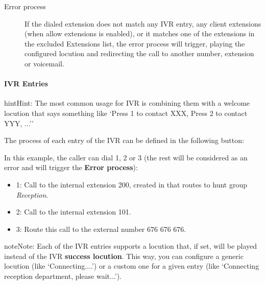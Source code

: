 \documentclass[letterpaper,10pt,english]{sphinxmanual}
\begin{document}
\begin{description}
\item[{Error process}] \leavevmode{}\label{administration_portal/client/vpbx/routing_endpoints/ivrs:term-error-process}
If the dialed extension does not match any IVR entry, any client extensions
(when allow extensions is enabled), or it matches one of the extensions in the
excluded Extensions list, the error process will trigger, playing the configured
locution and redirecting the call to another number, extension or voicemail.

\end{description}


\paragraph{IVR Entries}
\label{administration_portal/client/vpbx/routing_endpoints/ivrs:ivr-entries}
\begin{notice}{hint}{Hint:}
The most common usage for IVR is combining them with a welcome
locution that says something like `Press 1 to contact XXX, Press 2 to
contact YYY, ...''
\end{notice}

The process of each entry of the IVR can be defined in the following button:

In this example, the caller can dial 1, 2 or 3 (the rest will be considered as
an error and will trigger the \textbf{Error process}):
\begin{itemize}
\item {} 
1: Call to the internal extension 200, created in {\hyperref[administration_portal/client/vpbx/routing_endpoints/hunt_groups:huntgroups]{}} that routes to hunt group \emph{Reception}.

\item {} 
2: Call to the internal extension 101.

\item {} 
3: Route this call to the external number 676 676 676.

\end{itemize}

\begin{notice}{note}{Note:}
Each of the IVR entries supports a locution that, if set,
will be played instead of the IVR \textbf{success locution}. This way, you can
configure a generic locution (like `Connecting....') or a custom one for
a given entry (like `Connecting reception department, please wait...').
\end{notice}
\end{document}
